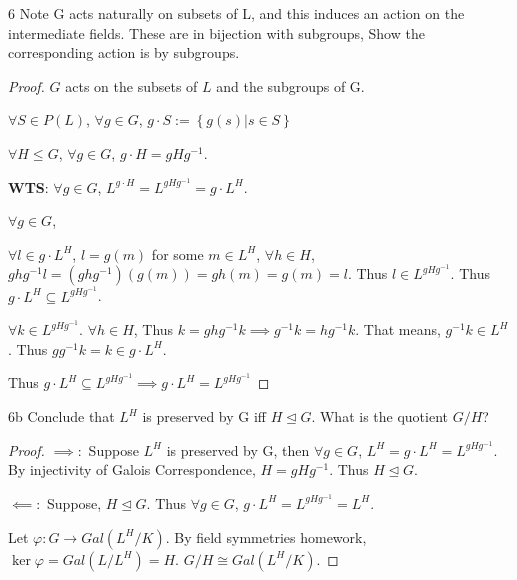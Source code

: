 \documentclass{article}
\begin{document}
\begin{PROB}{6}\label{Problem 6.}
    Note G acts naturally on subsets of L, and this induces an action on the intermediate fields. These are in bijection with subgroups, Show the corresponding action is by subgroups.     
\end{PROB}
\begin{proof}
    $G$ acts on the subsets of $L$ and the subgroups of G. 
    
    $\forall S \in P(L)$, $\forall g \in G$, $g \cdot S := \left\{ g(s) | s \in S \right\}$
    
    $\forall H \leq G$, $\forall g \in G$, $g \cdot H = gHg^{-1}$. 


    \textbf{WTS}: $\forall g \in G$, $L^{g \cdot H} = L^{gHg^{-1}} = g \cdot L^H$.
    
    $\forall g \in G$,
    
    $\forall l \in g \cdot L^H$, $l = g(m)$ for some $m \in L^H$, $\forall h \in H$, $g h g^{-1} l = (ghg^{-1})(g(m)) = gh(m) = g(m) = l$. Thus $l \in L^{gHg^{-1}}$. Thus $g \cdot L^H \subseteq L^{gHg^{-1}}$.    
    
    $\forall k \in L^{gHg^{-1}}$. $\forall h \in H$, Thus $k = ghg^{-1} k \implies g^{-1} k = hg^{-1}k$. That means, $g^{-1}k \in L^H$. Thus $g g^{-1} k = k \in g \cdot L^H$.
    
    Thus $g \cdot L^H \subseteq L^{gHg^{-1}} \implies g \cdot L^H =  L^{gHg^{-1}}$
\end{proof}
\begin{PROB}{6b}\label{Problem 6b.}
    Conclude that $L^H$  is preserved by G iff $H \trianglelefteq G$. What is the quotient $G/H$?
\end{PROB}
\begin{proof}
    $\implies: $ Suppose $L^H$ is preserved by G, then $\forall g \in G$, $L^H = g \cdot L^H = L^{gHg^{-1}}$. By injectivity of Galois Correspondence, $H = gHg^{-1}$. Thus $H \trianglelefteq G$. 
    
    $\impliedby: $ Suppose, $H \trianglelefteq G$. Thus $\forall g \in G$, $g \cdot L^H = L^{gHg^{-1}} = L^H$. 
    
    Let $\varphi: G \to Gal(L^H / K)$. By field symmetries homework, $\ker \varphi = Gal(L / L^H) = H$. $G / H \cong Gal(L^H / K)$. 
\end{proof}
\bigskip
\end{document}
